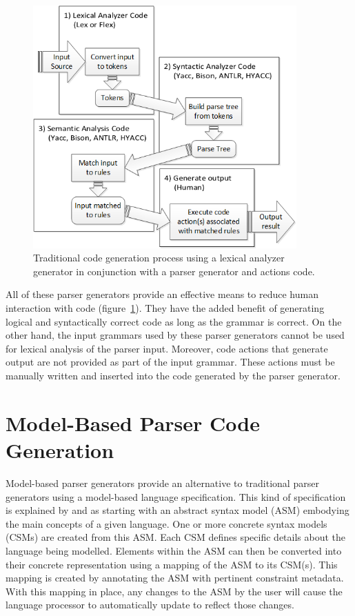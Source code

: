 \begin{figure}[htbp]
\centering
\includegraphics[width=0.9\textwidth]{figures/TraditionalCodeGenProcess.png}
\caption{Traditional code generation process using a lexical analyzer generator in conjunction with a parser generator and actions code.}
\label{fig:TraditionalCodeGenProcess}
\end{figure}

\indent
All of these parser generators provide an effective means to reduce human interaction with code (figure~\ref{fig:TraditionalCodeGenProcess}).  They have the added benefit of generating logical and syntactically correct code as long as the grammar is correct.  On the other hand, the input grammars used by these parser generators cannot be used for lexical analysis of the parser input.  Moreover, code actions that generate output are not provided as part of the input grammar.  These actions must be manually written and inserted into the code generated by the parser generator.

\section{Model-Based Parser Code Generation}

\indent
Model-based parser generators provide an alternative to traditional parser generators using a model-based language specification.  This kind of specification is explained by \cite{quesada_01} and \cite{quesada_02} as starting with an abstract syntax model (ASM) embodying the main concepts of a given language.  One or more concrete syntax models (CSMs) are created from this ASM.  Each CSM defines specific details about the language being modelled.  Elements within the ASM can then be converted into their concrete representation using a mapping of the ASM to its CSM(s).  This mapping is created by annotating the ASM with pertinent constraint metadata.  With this mapping in place, any changes to the ASM by the user will cause the language processor to automatically update to reflect those changes.

